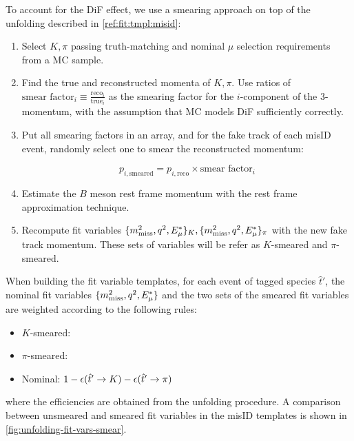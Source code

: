 To account for the DiF effect, we use a smearing approach on top of the
unfolding described in \cref{ref:fit:tmpl:misid}:

\begin{enumerate}
    \item Select $K, \pi$ passing truth-matching and nominal $\mu$ selection
        requirements from a MC sample.

    \item Find the true and reconstructed momenta of
        $K, \pi$.
        Use ratios of
        $\text{smear factor}_i \equiv \frac{\text{reco}_i}{\text{true}_i}$
        as the smearing factor for the $i$-component of the 3-momentum,
        with the assumption that MC models DiF sufficiently correctly.

    \item Put all smearing factors in an array,
        and for the fake \muon track of each misID event,
        randomly select one to smear the reconstructed momentum:

        \begin{equation}
            p_{i,\text{smeared}} =
                p_{i,\text{reco}} \times \text{smear factor}_i
        \end{equation}

    \item Estimate the $B$ meson rest frame momentum with the rest frame
        approximation technique. %
    \item Recompute fit variables
        $\{\mmSq, \qSq, \el\}_K, \{\mmSq, \qSq, \el\}_\pi$
        with the new fake \muon track momentum.
        These sets of variables will be refer as $K$-smeared and $\pi$-smeared.
\end{enumerate}

When building the fit variable templates, for each event of tagged species
$\hat{t}'$,
the nominal fit variables $\{\mmSq, \qSq, \el\}$ and the two sets of the smeared
fit variables are weighted according to the following rules:

\begin{itemize}
    \item $K$-smeared: 
    \item $\pi$-smeared: \misEff[\hat{t}']{\pi}
    \item Nominal: $1 - \misEff[\hat{t}']{K} - \misEff[\hat{t}']{\pi}$
\end{itemize}
where the efficiencies are obtained from the unfolding procedure.
A comparison between unsmeared and smeared fit variables in the misID templates
is shown in \cref{fig:unfolding-fit-vars-smear}.

